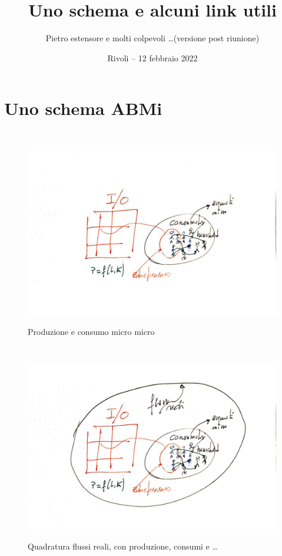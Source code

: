 \documentclass[9pt]{beamer}
\title{Uno schema e alcuni link utili}
\author[] %
{Pietro estensore e molti colpevoli \ldots (versione post riunione)}
\date[] %
{Rivoli -- 12 febbraio 2022}
\begin{document}
\begin{frame}


\titlepage


\end{frame}

\section{Uno schema ABMi}

\begin{frame}{~} %



\begin{figure}[H]
\center
\includegraphics[scale=0.50]{1.pdf}
\label{1}
\caption{Produzione e consumo micro micro}
\end{figure}

\end{frame}

\begin{frame}{~} %



\begin{figure}[H]
\center
\includegraphics[scale=0.50]{2.pdf}
\label{2}
\caption{Quadratura flussi reali, con produzione, consumi e \ldots}
\end{figure}

\end{frame}
\end{document}
